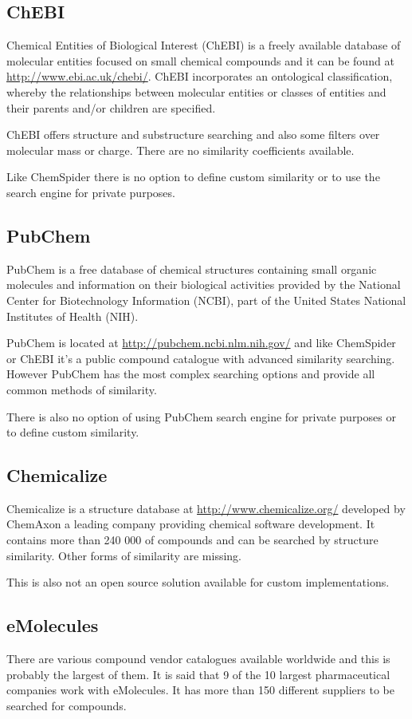 \documentclass[thesis=M,english]{FITthesis}[2012/10/20]
\begin{document}
\subsection{ChEBI}
Chemical Entities of Biological Interest (ChEBI) is a freely available database of molecular entities focused on small chemical compounds and it can be found at \url{http://www.ebi.ac.uk/chebi/}. ChEBI incorporates an ontological classification, whereby the relationships between molecular entities or classes of entities and their parents and/or children are specified.\cite{taverna}

ChEBI offers structure and substructure searching and also some filters over molecular mass or charge. There are no similarity coefficients available.

Like ChemSpider there is no option to define custom similarity or to use the search engine for private purposes.

\subsection{PubChem}
PubChem is a free database of chemical structures containing small organic molecules and information on their biological activities provided by the National Center for Biotechnology Information (NCBI), part of the United States National Institutes of Health (NIH). \cite{taverna}

PubChem is located at \url{http://pubchem.ncbi.nlm.nih.gov/} and like ChemSpider or ChEBI it’s a public compound catalogue with advanced similarity searching. However PubChem has the most complex searching options and provide all common methods of similarity.

There is also no option of using PubChem search engine for private purposes or to define custom similarity.

\subsection{Chemicalize}
Chemicalize is a structure database at \url{http://www.chemicalize.org/} developed by ChemAxon a leading company providing chemical software development. It contains more than 240 000 of compounds and can be searched by structure similarity. Other forms of similarity are missing.

This is also not an open source solution available for custom implementations.

\subsection{eMolecules}
There are various compound vendor catalogues available worldwide and this is probably the largest of them. It is said that 9 of the 10 largest pharmaceutical companies work with eMolecules. It has more than 150 different suppliers to be searched for compounds.\cite{emolecules}
\end{document}
